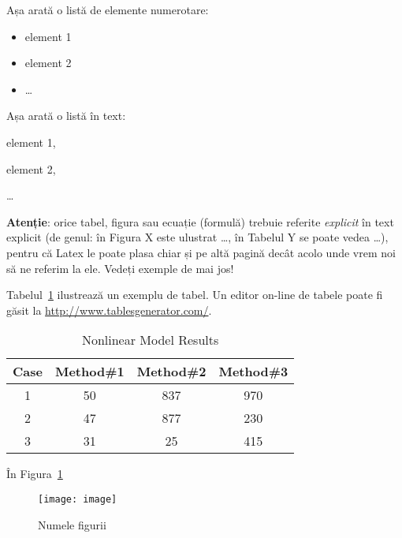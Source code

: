 Așa arată o listă de elemente numerotare:
\begin{itemize}
  \item element 1
  \item element 2
  \item \dots
\end{itemize}


Așa arată o listă în text: 
\begin{inparaenum}[(\itshape 1 \upshape)]
  \item element 1, 
  \item element 2, 
  \item \dots
\end{inparaenum}

\textbf{Atenție}: orice tabel, figura sau ecuație (formulă) trebuie referite \textit{explicit} în text explicit (de genul: în Figura X este ulustrat \dots, în Tabelul Y se poate vedea \dots), pentru că Latex le poate plasa chiar și pe altă pagină decât acolo unde vrem noi să ne referim la ele. Vedeți exemple de mai jos!

Tabelul~\ref{table:example} ilustrează un exemplu de tabel. Un editor on-line de tabele poate fi găsit la \url{http://www.tablesgenerator.com/}. 

\begin{table}[t]
\centering                          %
\begin{tabular}{|c|c|c|c|}          %
\hline\hline                        %
Case & Method\#1 & Method\#2 & Method\#3 \\ [0.5ex]   %
\hline                              %
1 & 50 & 837 & 970 \\               %
2 & 47 & 877 & 230 \\
3 & 31 & 25 & 415 \\[1ex]           %
\hline                              
\end{tabular}
\caption{Nonlinear Model Results}   %
\label{table:example}                %
\end{table}

În Figura~\ref{fig:exemplu} 

\begin{figure}
    \centering
    \texttt{[image: image]}
    \caption{Numele figurii}
    \label{fig:exemplu}
\end{figure}


